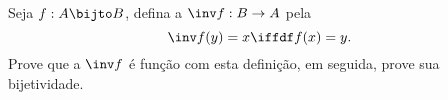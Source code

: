 \begin{exercise}
%
Seja $f : A \bijto B$, defina a  $\inv f : B \to A$ pela
$$
\inv f (y) = x \iffdf f(x) = y.
$$
Prove que a $\inv f$ é função com esta definição, em seguida, prove sua bijetividade.
\end{exercise}

